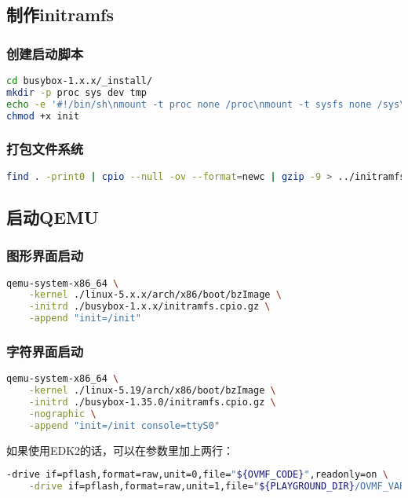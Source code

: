 \subsection{制作initramfs}
\subsubsection{创建启动脚本}
\begin{lstlisting}[language=bash]
cd busybox-1.x.x/_install/
mkdir -p proc sys dev tmp
echo -e '#!/bin/sh\nmount -t proc none /proc\nmount -t sysfs none /sys\nmount -t tmpfs none /tmp\nmount -t devtmpfs none /dev\necho "Hello Linux!"\nexec /bin/sh' > init
chmod +x init
\end{lstlisting}

\subsubsection{打包文件系统}
\begin{lstlisting}[language=bash]
find . -print0 | cpio --null -ov --format=newc | gzip -9 > ../initramfs.cpio.gz
\end{lstlisting}

\subsection{启动QEMU}
\subsubsection{图形界面启动}
\begin{lstlisting}[language=bash]
qemu-system-x86_64 \
    -kernel ./linux-5.x.x/arch/x86/boot/bzImage \
    -initrd ./busybox-1.x.x/initramfs.cpio.gz \
    -append "init=/init"
\end{lstlisting}

\subsubsection{字符界面启动}
\begin{lstlisting}[language=bash]
qemu-system-x86_64 \
    -kernel ./linux-5.19/arch/x86/boot/bzImage \
    -initrd ./busybox-1.35.0/initramfs.cpio.gz \
    -nographic \
    -append "init=/init console=ttyS0"
\end{lstlisting}
如果使用EDK2的话，可以在参数里加上两行：
\begin{lstlisting}[language=bash]
    -drive if=pflash,format=raw,unit=0,file="${OVMF_CODE}",readonly=on \
    -drive if=pflash,format=raw,unit=1,file="${PLAYGROUND_DIR}/OVMF_VARS.fd" \
\end{lstlisting}

